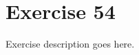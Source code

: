 \section{Exercise 54}
\begin{question}
   Exercise description goes here. 
\end{question}

\begin{solution}
\end{solution}
